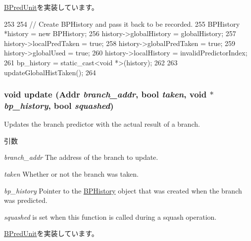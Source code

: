 \hyperlink{classBPredUnit_a17161e0c51444f148e49e4df2ba89704}{BPredUnit}を実装しています。


\begin{DoxyCode}
253 {
254     // Create BPHistory and pass it back to be recorded.
255     BPHistory *history = new BPHistory;
256     history->globalHistory = globalHistory;
257     history->localPredTaken = true;
258     history->globalPredTaken = true;
259     history->globalUsed = true;
260     history->localHistory = invalidPredictorIndex;
261     bp_history = static_cast<void *>(history);
262 
263     updateGlobalHistTaken();
264 }
\end{DoxyCode}
\hypertarget{classTournamentBP_a590e0fd17d5b663e25f0e956fadc7062}{
\subsubsection[{update}]{\setlength{\rightskip}{0pt plus 5cm}void update ({\bf Addr} {\em branch\_\-addr}, \/  bool {\em taken}, \/  void $\ast$ {\em bp\_\-history}, \/  bool {\em squashed})}}
\label{classTournamentBP_a590e0fd17d5b663e25f0e956fadc7062}
Updates the branch predictor with the actual result of a branch. 
\begin{DoxyParams}{引数}
\item[{\em branch\_\-addr}]The address of the branch to update. \item[{\em taken}]Whether or not the branch was taken. \item[{\em bp\_\-history}]Pointer to the \hyperlink{structTournamentBP_1_1BPHistory}{BPHistory} object that was created when the branch was predicted. \item[{\em squashed}]is set when this function is called during a squash operation. \end{DoxyParams}


\hyperlink{classBPredUnit_ab00dd76dc9f830cdae0edc72357c013a}{BPredUnit}を実装しています。


